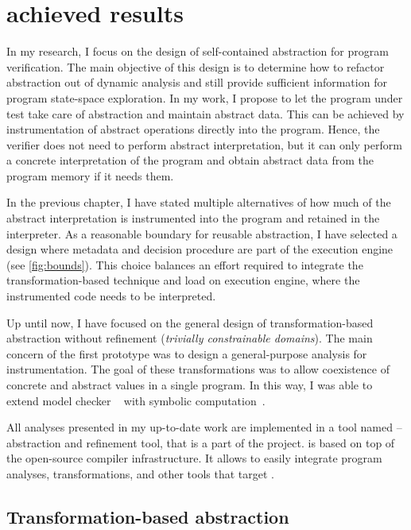 \chapter{achieved results}
\label{ch:results}


In my research, I focus on the design of self-contained abstraction for program
verification. The main objective of this design is to determine how to refactor
abstraction out of dynamic analysis and still provide sufficient information
for program state-space exploration. In my work, I propose to let the program
under test take care of abstraction and maintain abstract data. This can be
achieved by instrumentation of abstract operations directly into the program.
Hence, the verifier does not need to perform abstract interpretation, but it
can only perform a concrete interpretation of the program and obtain abstract
data from the program memory if it needs them.

In the previous chapter, I have stated multiple alternatives of how much of the
abstract interpretation is instrumented into the program and retained in the
interpreter.  As a reasonable boundary for reusable abstraction, I have
selected a design where metadata and decision procedure are part of the
execution engine (see \autoref{fig:bounds}). This choice balances an effort
required to integrate the transformation-based technique and load on execution
engine, where the instrumented code needs to be interpreted.

Up until now, I have focused on the general design of trans\-for\-mation-based
abstraction without refinement (\emph{trivially constrainable domains}). The
main concern of the first prototype was to design a general-purpose analysis
for instrumentation. The goal of these transformations was to allow coexistence
of concrete and abstract values in a single program. In this way, I was able to
extend model checker \divine~\cite{Divine17} with symbolic
computation~\cite{Lauko2019Sym, Lauko2018SymComp}.

All analyses presented in my up-to-date work are implemented in a tool named
\lart{} -- \llvm abstraction and refinement tool, that is a part of the \divine
project. \lart is based on top of the open-source \llvm compiler
infrastructure. It allows \lart to easily integrate program analyses,
transformations, and other tools that target \llvm.

\section{Transformation-based abstraction}
\label{sec:symbolic}

